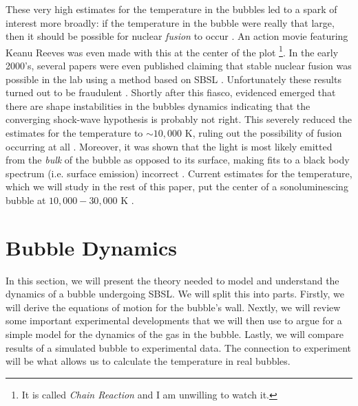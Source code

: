 \documentclass[rmp,aps,nofootinbib,superscriptaddress,floatfix]{revtex4-2}
\begin{document}
These very high estimates for the temperature in the bubbles led to a spark of interest more broadly: if the temperature in the bubble were really that large, then it should be possible for nuclear \emph{fusion} to occur \cite{}. An action movie featuring Keanu Reeves was even made with this at the center of the plot \footnote{It is called \emph{Chain Reaction} and I am unwilling to watch it.}. In the early 2000's, several papers were even published claiming that stable nuclear fusion was possible in the lab using a method based on SBSL \cite{}. Unfortunately these results turned out to be fraudulent \cite{}. Shortly after this fiasco, evidenced emerged that there are shape instabilities in the bubbles dynamics indicating that the converging shock-wave hypothesis is probably not right. This severely reduced the estimates for the temperature to $\sim 10,000$ K, ruling out the possibility of fusion occurring at all \cite{}. Moreover, it was shown that the light is most likely emitted from the \emph{bulk} of the bubble as opposed to its surface, making fits to a black body spectrum (i.e. surface emission) incorrect \cite{}. Current estimates for the temperature, which we will study in the rest of this paper, put the center of a sonoluminescing bubble at $10,000-30,000$ K \cite{flannigan2005plasma,suslick2008inside,yasui2018acoustic,an2009diagnosing,an2008spectral,an2006mechanism}.

\section{Bubble Dynamics}
In this section, we will present the theory needed to model and understand the dynamics of a bubble undergoing SBSL. We will split this into parts. Firstly, we will derive the equations of motion for the bubble's wall. Nextly, we will review some important experimental developments that we will then use to argue for a simple model for the dynamics of the gas in the bubble. Lastly, we will compare results of a simulated bubble to experimental data. The connection to experiment will be what allows us to calculate the temperature in real bubbles.
\end{document}
